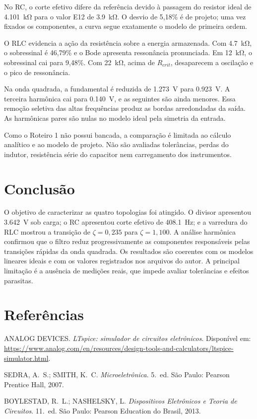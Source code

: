 \documentclass[11pt,a4paper]{article}
\begin{document}
No RC, o corte efetivo difere da referência devido à passagem do resistor ideal de
\SI{4,101}{\kilo\ohm} para o valor E12 de \SI{3,9}{\kilo\ohm}. O desvio de 5,18\% é de projeto;
uma vez fixados os componentes, a curva segue exatamente o modelo de primeira ordem.

O RLC evidencia a ação da resistência sobre a energia armazenada. Com \SI{4,7}{\kilo\ohm}, o
sobressinal é 46,79\% e o Bode apresenta ressonância pronunciada. Em \SI{12}{\kilo\ohm}, o
sobressinal cai para 9,48\%. Com \SI{22}{\kilo\ohm}, acima de $R_{crit}$, desaparecem a oscilação
e o pico de ressonância.

Na onda quadrada, a fundamental é reduzida de \SI{1,273}{\volt} para \SI{0,923}{\volt}. A terceira
harmônica cai para \SI{0,140}{\volt}, e as seguintes são ainda menores. Essa remoção seletiva das
altas frequências produz as bordas arredondadas da saída. As harmônicas pares são nulas no modelo
ideal pela simetria da entrada.

Como o Roteiro 1 não possui bancada, a comparação é limitada ao cálculo analítico e ao modelo de
projeto. Não são avaliadas tolerâncias, perdas do indutor, resistência série do capacitor nem
carregamento dos instrumentos.

\section{Conclusão}

O objetivo de caracterizar as quatro topologias foi atingido. O divisor apresentou
\SI{3,642}{\volt} sob carga; o RC apresentou corte efetivo de \SI{408,1}{\hertz}; e a varredura do
RLC mostrou a transição de $\zeta=0,235$ para $\zeta=1,100$. A análise harmônica confirmou que o
filtro reduz progressivamente as componentes responsáveis pelas transições rápidas da onda
quadrada. Os resultados são coerentes com os modelos lineares ideais e com os valores registrados
nos arquivos do autor. A principal limitação é a ausência de medições reais, que impede avaliar
tolerâncias e efeitos parasitas.

\FloatBarrier
\section{Referências}

\begin{referencias}
\item ANALOG DEVICES. \emph{LTspice: simulador de circuitos eletrônicos}. Disponível em:
      \url{https://www.analog.com/en/resources/design-tools-and-calculators/ltspice-simulator.html}.
\item SEDRA, A.~S.; SMITH, K.~C. \emph{Microeletrônica}. 5.~ed. São Paulo: Pearson Prentice Hall, 2007.
\item BOYLESTAD, R.~L.; NASHELSKY, L. \emph{Dispositivos Eletrônicos e Teoria de Circuitos}.
      11.~ed. São Paulo: Pearson Education do Brasil, 2013.
\end{referencias}
\end{document}
